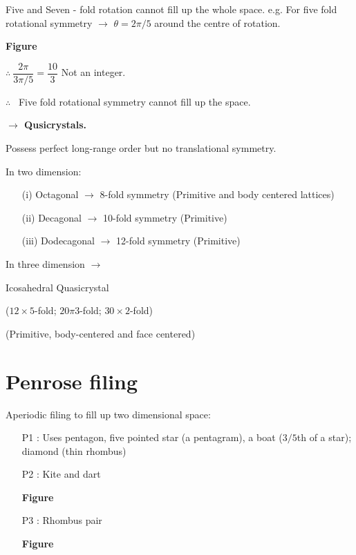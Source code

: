 Five and Seven - fold rotation cannot fill up the whole space. e.g. For five fold rotational symmetry $\to$ $\theta=2\pi/5$ around the centre of rotation.
\begin{center}
{\bf Figure}
\end{center}

$\therefore \ \dfrac{2\pi}{3\pi/5}=\dfrac{10}{3}$ Not an integer.

$\therefore$ \ Five fold rotational symmetry cannot fill up the space.

{\bf $\to$ Qusicrystals.}

Possess perfect long-range order but no translational symmetry.

In two dimension:
\begin{itemize}
\item[(i)] Octagonal $\to$ 8-fold symmetry (Primitive and body centered lattices)

\item[(ii)] Decagonal $\to$ 10-fold symmetry (Primitive)

\item[(iii)] Dodecagonal $\to$ 12-fold symmetry (Primitive)
\end{itemize}

In three dimension $\to$

Icosahedral Quasicrystal

($12\times 5$-fold; $20\pi 3$-fold; $30\times 2$-fold)

(Primitive, body-centered and face centered)

\section*{Penrose filing}

Aperiodic filing to fill up two dimensional space:
\begin{itemize}
\item[P1 :] Uses pentagon, five pointed star (a pentagram), a boat ($3/5$th of a star); diamond (thin rhombus)

\item[P2 :] Kite and dart
\begin{center}
{\bf Figure}
\end{center}

\item[P3 :] Rhombus pair
\begin{center}
{\bf Figure}
\end{center}
\end{itemize}

